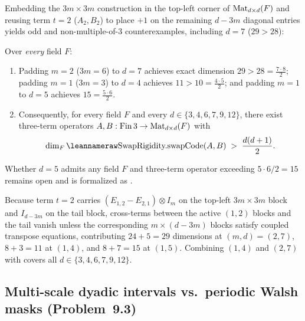 Embedding the $3m \times 3m$ construction in the top-left corner of $\operatorname{Mat}_{d\times d}(F)$ and
reusing term $t = 2$ ($A_2, B_2$) to place $+1$ on the remaining $d - 3m$ diagonal entries yields
odd and non-multiple-of-$3$ counterexamples, including $d = 7$ ($29 > 28$):

\begin{theorem}\label{thm:three-term-unified}
Over \emph{every} field $F$:
\begin{enumerate}[label=(\alph*)]
\item Padding $m = 2$ ($3m = 6$) to $d = 7$ achieves exact dimension $29 > 28 = \frac{7\cdot 8}{2}$;
  padding $m = 1$ ($3m = 3$) to $d = 4$ achieves $11 > 10 = \frac{4\cdot 5}{2}$; and padding
  $m = 1$ to $d = 5$ achieves $15 = \frac{5\cdot 6}{2}$.
\item Consequently, for every field $F$ and every $d \in \{3, 4, 6, 7, 9, 12\}$, there exist
  three-term operators $A, B : \mathrm{Fin}\,3 \to \operatorname{Mat}_{d\times d}(F)$ with
  \[
    \dim_F \leanname{SwapRigidity.swapCode}(A, B) \;>\; \frac{d(d+1)}{2}.
  \]
\end{enumerate}
Whether $d = 5$ admits any field $F$ and three-term operator exceeding $5 \cdot 6 / 2 = 15$ remains
open and is formalized as .
\end{theorem}
\begin{outline}
Because term $t = 2$ carries $(E_{1,2} - E_{2,1}) \otimes I_m$ on the top-left $3m \times 3m$ block
and $I_{d-3m}$ on the tail block, cross-terms between the active $(1,2)$ blocks and the tail vanish
unless the corresponding $m \times (d-3m)$ blocks satisfy coupled transpose equations, contributing
$24 + 5 = 29$ dimensions at $(m, d) = (2, 7)$, $8 + 3 = 11$ at $(1, 4)$, and $8 + 7 = 15$ at
$(1, 5)$. Combining $(1,4)$ and $(2,7)$ with  covers all
$d \in \{3, 4, 6, 7, 9, 12\}$.
\end{outline}

\subsection{Multi-scale dyadic intervals vs.\ periodic Walsh masks (Problem~9.3)}\label{sec:problem-9-3}

